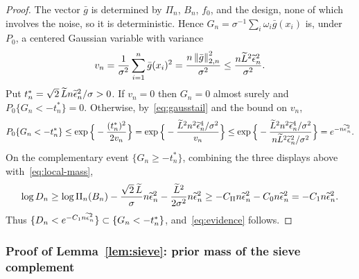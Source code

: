 \begin{proof}
The vector $\bar g$ is determined by $\Pi_n$, $B_n$, $f_0$, and the design, none of which involves the noise, so it is deterministic. Hence $G_n=\sigma^{-1}\sum_i\omega_i\bar g(x_i)$ is, under $P_0$, a centered Gaussian variable with variance
\begin{align*}
v_n=\frac1{\sigma^2}\sum_{i=1}^n\bar g(x_i)^2=\frac{n\left\lVert \bar g \right\rVert_{2,n}^2}{\sigma^2}\leq\frac{n\widetilde L^2\widetilde{\epsilon}_n^2}{\sigma^2}.
\end{align*}
Put $t_n^*=\sqrt2\,\widetilde L n\widetilde{\epsilon}_n^2/\sigma>0$. If $v_n=0$ then $G_n=0$ almost surely and $P_0\{G_n<-t_n^*\}=0$. Otherwise, by~\eqref{eq:gausstail} and the bound on $v_n$,
\begin{align*}
P_0\{G_n<-t_n^*\}
\leq\exp\Big\{-\frac{(t_n^*)^2}{2v_n}\Big\}
=\exp\Big\{-\frac{\widetilde L^2n^2\widetilde{\epsilon}_n^4/\sigma^2}{v_n}\Big\}
\leq\exp\Big\{-\frac{\widetilde L^2n^2\widetilde{\epsilon}_n^4/\sigma^2}{n\widetilde L^2\widetilde{\epsilon}_n^2/\sigma^2}\Big\}
=e^{-n\widetilde{\epsilon}_n^2}.
\end{align*}
On the complementary event $\{G_n\geq-t_n^*\}$, combining the three displays above with~\eqref{eq:local-mass},
\begin{align*}
\log D_n
\geq\log\Pi_n(B_n)-\frac{\sqrt2\,\widetilde L}{\sigma}n\widetilde{\epsilon}_n^2-\frac{\widetilde L^2}{2\sigma^2}n\widetilde{\epsilon}_n^2
\geq-C_\Pi n\widetilde{\epsilon}_n^2-C_0n\widetilde{\epsilon}_n^2
=-C_1n\widetilde{\epsilon}_n^2 .
\end{align*}
Thus $\{D_n<e^{-C_1n\widetilde{\epsilon}_n^2}\}\subset\{G_n<-t_n^*\}$, and~\eqref{eq:evidence} follows.
\end{proof}

\subsubsection*{Proof of Lemma~\ref{lem:sieve}: prior mass of the sieve complement}

